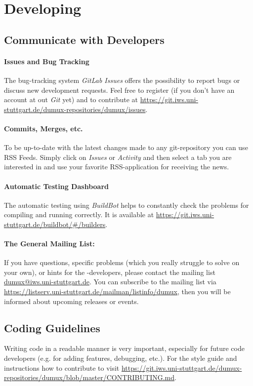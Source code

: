 \section{Developing \Dumux}
\label{sc_developingdumux}

\subsection{Communicate with \Dumux Developers}

\paragraph{Issues and Bug Tracking}
The bug-tracking system \emph{GitLab Issues} offers the possibility to report bugs or discuss new development requests.
Feel free to register (if you don't have an account at out \emph{Git} yet) and to contribute
at \url{https://git.iws.uni-stuttgart.de/dumux-repositories/dumux/issues}.

\paragraph{Commits, Merges, etc.}
To be up-to-date with the latest changes made to any git-repository you can use RSS Feeds.
Simply click on \emph{Issues} or \emph{Activity} and then select a tab you are interested in
and use your favorite RSS-application for receiving the news.

\paragraph{Automatic Testing Dashboard}
The automatic testing using \emph{BuildBot} helps to constantly check the
\Dumux problems for compiling and running correctly. It is available at
\url{https://git.iws.uni-stuttgart.de/buildbot/#/builders}.

\paragraph{The General Mailing List:}
If you have questions, specific problems (which you really struggle to solve on your own),
or hints for the \Dumux-developers, please contact the mailing list \url{dumux@iws.uni-stuttgart.de}.
You can subscribe to the mailing list via
\url{https://listserv.uni-stuttgart.de/mailman/listinfo/dumux}, then you
will be informed about upcoming releases or events.

\subsection{Coding Guidelines}
Writing code in a readable manner is very important, especially
for future code developers (e.g. for adding features, debugging, etc.).
For the style guide and instructions how to contribute to \Dumux visit
\url{https://git.iws.uni-stuttgart.de/dumux-repositories/dumux/blob/master/CONTRIBUTING.md}.


